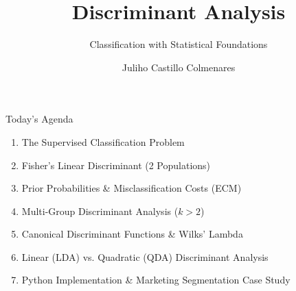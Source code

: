 \documentclass[aspectratio=169,ignorenonframetext]{beamer}
\title{\texorpdfstring{Discriminant Analysis}{Discriminant Analysis}}
\author{\texorpdfstring{Juliho Castillo
Colmenares}{Juliho Castillo Colmenares}}
\subtitle{Classification with Statistical Foundations}
\institute{Tec de Monterrey}
\date{}
\begin{document}
\frame{\titlepage}

\begin{frame}{Today's Agenda}
\begin{enumerate}
\item
  The Supervised Classification Problem
\item
  Fisher's Linear Discriminant (2 Populations)
\item
  Prior Probabilities \& Misclassification Costs (ECM)
\item
  Multi-Group Discriminant Analysis (\(k > 2\))
\item
  Canonical Discriminant Functions \& Wilks' Lambda
\item
  Linear (LDA) vs. Quadratic (QDA) Discriminant Analysis
\item
  Python Implementation \& Marketing Segmentation Case Study
\end{enumerate}
\end{frame}
\end{document}
